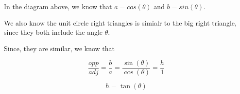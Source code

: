 \documentclass{ximera}
\begin{document}
\begin{image}
\end{image}



In the diagram above, we know that $a = cos(\theta)$ and $b = sin(\theta)$.

We also know the unit circle right triangles is simialr to the big right triangle, since they both include the angle $\theta$.

Since, they are similar, we know that 


\[    \frac{opp}{adj} = \frac{b}{a}  = \frac{\sin(\theta)}{\cos(\theta)}   = \frac{h}{1}          \]


\[         h = \tan(\theta)\]
\end{document}
